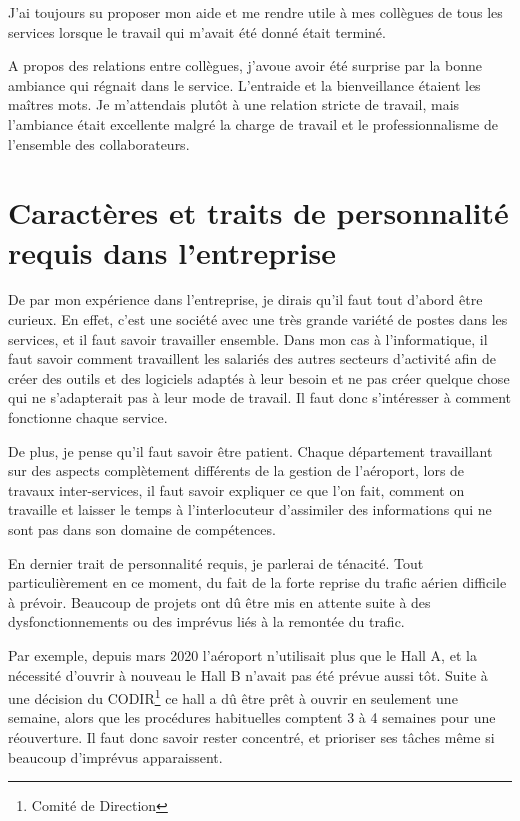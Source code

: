 J’ai toujours su proposer mon aide et me rendre utile à mes collègues de tous les services lorsque le travail qui m’avait été donné était terminé.

A propos des relations entre collègues, j’avoue avoir été surprise par la bonne ambiance qui régnait dans le service. L’entraide et la bienveillance étaient les maîtres mots. Je m’attendais plutôt à une relation stricte de travail, mais l’ambiance était excellente malgré la charge de travail et le professionnalisme de l’ensemble des collaborateurs.


\section{Caractères et traits de personnalité requis dans l'entreprise}

De par mon expérience dans l'entreprise, je dirais qu'il faut tout d'abord être curieux. En effet, c'est une société avec une très grande variété de postes dans les services, et il faut savoir travailler ensemble.
Dans mon cas à l'informatique, il faut savoir comment travaillent les salariés des autres secteurs d'activité afin de créer des outils et des logiciels adaptés à leur besoin et ne pas créer quelque chose qui ne s'adapterait pas à leur mode de travail.
Il faut donc s'intéresser à comment fonctionne chaque service.\newline

De plus, je pense qu'il faut savoir être patient. Chaque département travaillant sur des aspects complètement différents de la gestion de l'aéroport, lors de travaux inter-services, il faut savoir expliquer ce que l'on fait, comment on travaille et laisser le temps à l'interlocuteur d'assimiler des informations qui ne sont pas dans son domaine de compétences.\newline

En dernier trait de personnalité requis, je parlerai de ténacité. Tout particulièrement en ce moment, du fait de la forte reprise du trafic aérien difficile à prévoir. Beaucoup de projets ont dû être mis en attente suite à des dysfonctionnements ou des imprévus liés à la remontée du trafic.

Par exemple, depuis mars 2020 l’aéroport n’utilisait plus que le Hall A, et la nécessité d’ouvrir à nouveau le Hall B n’avait pas été prévue aussi tôt. Suite à une décision du CODIR\footnote{Comité de Direction} ce hall a dû être prêt à ouvrir en seulement une semaine, alors que les procédures habituelles comptent 3 à 4 semaines pour une réouverture. Il faut donc savoir rester concentré, et prioriser ses tâches même si beaucoup d'imprévus apparaissent.

